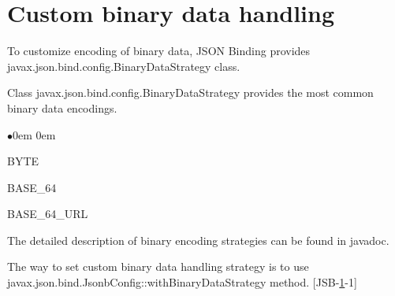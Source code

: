 \section{Custom binary data handling}
\label{sec:custom_binary_data}

To customize encoding of binary data, JSON Binding provides javax.json.bind.config.BinaryDataStrategy class.

Class javax.json.bind.config.BinaryDataStrategy provides the most common binary data encodings.

\begin{list}{$\bullet$}{\parsep 0em  0em}
\item BYTE
\item BASE\_64
\item BASE\_64\_URL
\end{list}

The detailed description of binary encoding strategies can be found in javadoc.

The way to set custom binary data handling strategy is to use javax.json.bind.JsonbConfig::withBinaryDataStrategy method. [JSB-\ref{sec:custom_binary_data}-1]
